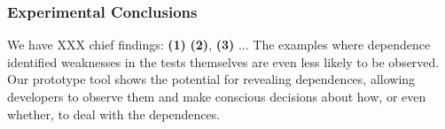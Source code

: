 \subsubsection{Experimental Conclusions}


We have XXX chief findings: \textbf{(1)}
\textbf{(2)}, \textbf{(3)} ...
The examples where dependence identified weaknesses in the tests themselves
are even less likely to be observed.  
Our prototype tool shows
the potential for revealing dependences, allowing
developers to observe them and make conscious decisions about how, or even whether,
to deal with the dependences. 
